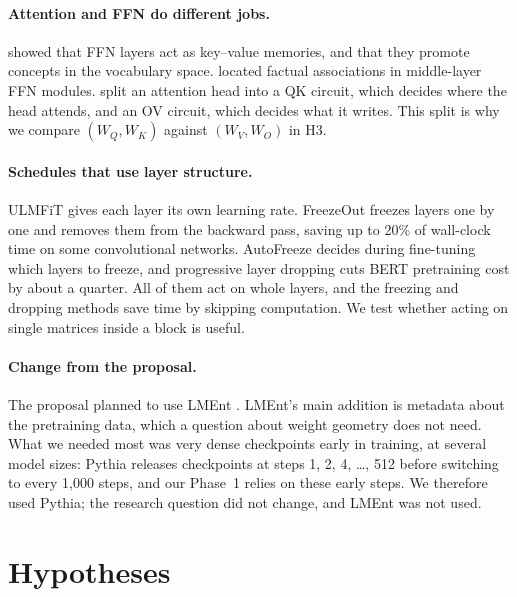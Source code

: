 \documentclass[11pt]{article}
\newcommand{\Wq}{W_Q}
\newcommand{\Wk}{W_K}
\newcommand{\Wv}{W_V}
\newcommand{\Wo}{W_O}
\begin{document}
\paragraph{Attention and FFN do different jobs.} \citet{geva2021kv} showed
that FFN layers act as key--value memories, and \citet{geva2022promoting} that
they promote concepts in the vocabulary space. \citet{meng2022rome} located
factual associations in middle-layer FFN modules. \citet{elhage2021framework}
split an attention head into a QK circuit, which decides where the head
attends, and an OV circuit, which decides what it writes. This split is why we
compare $(\Wq,\Wk)$ against $(\Wv,\Wo)$ in H3.

\paragraph{Schedules that use layer structure.} ULMFiT
\citep{howard2018ulmfit} gives each layer its own learning rate. FreezeOut
\citep{brock2017freezeout} freezes layers one by one and removes them from the
backward pass, saving up to 20\% of wall-clock time on some convolutional
networks.
AutoFreeze \citep{liu2021autofreeze} decides during fine-tuning which layers to
freeze, and progressive layer dropping \citep{zhang2020pld} cuts BERT
pretraining cost by about a quarter. All of them act on whole layers, and the
freezing and dropping methods save time by skipping computation. We test whether acting on single
matrices inside a block is useful.

\paragraph{Change from the proposal.} The proposal planned to use LMEnt
\citep{gottesman2025lment}. LMEnt's main addition is metadata about the
pretraining data, which a question about weight geometry does not need. What
we needed most was very dense checkpoints early in training, at several model
sizes: Pythia releases checkpoints at steps 1, 2, 4, \dots, 512 before
switching to every 1,000 steps, and our Phase~1 relies on these early steps. We therefore used Pythia; the research question did not
change, and LMEnt was not used.

\section{Hypotheses}
\end{document}
